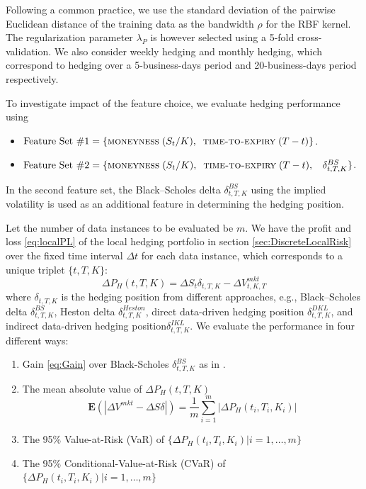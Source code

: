 \documentclass[letterpaper,12pt,titlepage,oneside,final]{book}
\numberwithin{equation}{section}
\theoremstyle{definition}
\newcommand{\E}{\mathbf{E}}
\newcommand{\DS}{\Delta S}
\newcommand{\DVmkt}{\Delta V^{mkt}}
\newcommand{\DT}{\Delta t}
\newcommand{\MeanAbs}{\E(|\DVmkt-\DS \delta |)}
\newcommand{\Smkt}{S}
\begin{document}
Following a common practice, we use the standard deviation of the pairwise Euclidean distance of the training data as the bandwidth $\rho$ for the RBF kernel. The regularization parameter $\lambda_P$  is however selected using a 5-fold cross-validation. We also consider weekly hedging and monthly hedging, which correspond to hedging over a 5-business-days period and 20-business-days period respectively.

To investigate impact of the feature choice,  we evaluate hedging performance using
\begin{itemize}
\item
$\text{Feature Set \#1} = \{\textsc{moneyness}\; (S_t/K),\;\;\textsc{time-to-expiry}\; (T-t)\}$.
\item
$\text{Feature Set \#2} = \{\textsc{moneyness} \;(S_t/K),\;\;\textsc{time-to-expiry} \;(T-t) ,\;\;~ \delta^{BS}_{t,T,K}\}$.
\end{itemize}
In the second feature set,  the Black–Scholes delta $\delta^{BS}_{t,T,K}$ using the implied volatility  is used as an additional feature in determining the hedging position. 

Let the number of data instances to be evaluated be $m$.
We have the profit and loss \eqref{eq:localPL} of the local hedging portfolio in section \ref{sec:DiscreteLocalRisk} over the fixed time interval $\DT$ for each data instance, which corresponds to a unique triplet $\{t,T,K\}$:
\[
	\Delta P_{H}(t,T,K)=\Delta \Smkt_{t} \delta_{t,T,K} -\Delta V^{mkt}_{t,K,T}
\]
where $\delta_{t,T,K}$ is the hedging position from different approaches, e.g., Black–Scholes delta $\delta^{BS}_{t,T,K}$, Heston delta $\delta^{Heston}_{t,T,K}$, direct data-driven hedging position $\delta^{DKL}_{t,T,K}$, and  indirect data-driven hedging position$\delta^{IKL}_{t,T,K}$.
We evaluate the performance in four different ways:
\begin{enumerate}
	\item Gain \eqref{eq:Gain} over Black-Scholes $\delta^{BS}_{t,T,K}$ as in \cite{hulloptimal}.
	\item The mean absolute value of $\Delta P_{H}(t,T,K)$
	\[
		\MeanAbs=\frac{1}{m}\sum_{i=1}^m |\Delta P_{H}(t_i,T_i,K_i)|
	\]

	\item The 95\% Value-at-Risk (VaR) of $\{\Delta P_{H}(t_i,T_i,K_i)| i=1,\dots, m\}$
	\item The 95\% Conditional-Value-at-Risk (CVaR) of $\{\Delta P_{H}(t_i,T_i,K_i)| i=1,\dots, m\}$
\end{enumerate}
\end{document}
